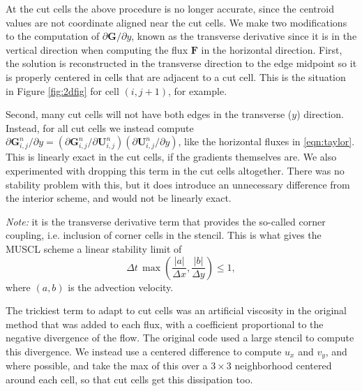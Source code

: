 At the cut cells the above procedure is no longer accurate,
since  the centroid values are not coordinate aligned near
the cut cells.
We make two modifications to the
computation of $\partial \mathbf{G}/\partial y$, known as the
transverse derivative since it is in the vertical direction
when computing the flux $\mathbf{F}$ in the horizontal direction.
First,
the solution is reconstructed in the transverse direction
to the edge midpoint so it is properly centered in cells that
are adjacent to a cut cell.  This is the situation
in Figure \ref{fig:2dfig} for cell $(i,j+1)$, for example.

Second, many cut cells will not have both edges in the
transverse ($y$) direction. Instead, for all cut cells we
instead compute
$ \partial \mathbf{G}_{i,j}^n / \partial y = ( \partial \mathbf{G}_{i,j}^n / \partial \mathbf{U}_{i,j}^n)( \partial \mathbf{U}_{i,j}^n / \partial y)$,
like the horizontal fluxes in \eqref{eqn:taylor}. This is linearly exact in the cut cells, 
if the gradients themselves are.
We also experimented with dropping this term in the cut cells
altogether. There was no stability problem with this, but it
does introduce an unnecessary difference from
the interior scheme, and would not be linearly exact.

\textit{Note:} it is the transverse derivative term that provides the so-called corner 
coupling, i.e. inclusion
of corner cells in the stencil. This is what  gives  the MUSCL scheme a linear stability limit of
\begin{equation}
\label{eqn:bigcfllimit}
\Delta t \, \max \left (\frac{|a|}{\Delta x} , \frac{|b|}{\Delta y} \right) \leq 1,
\end{equation}
where $(a,b)$ is the advection velocity.  

The trickiest term to adapt to cut cells was an artificial viscosity in the original method that was 
added to each flux, with a
coefficient proportional to the negative divergence of the flow.  The original
code used a large stencil to compute this divergence. We instead use a centered
difference to compute $u_x$ and $v_y$, and where possible, and  
take the max of this over a $3 \times  3$
neighborhood centered around each cell, so that cut cells get this dissipation too. 


